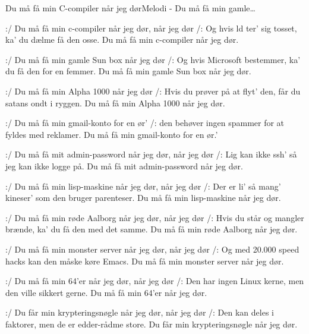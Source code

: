 \begin{sang}{Du må få min C-compiler når jeg dør}{Melodi - Du må få min gamle…}

\begin{vers}
:/ Du må få min c-compiler når jeg dør, når jeg dør /:
Og hvis ld ter' sig tosset, ka' du dælme få den osse.
Du må få min c-compiler når jeg dør.
\end{vers}
\begin{vers}
:/ Du må få min gamle Sun box når jeg dør /:
Og hvis Microsoft bestemmer, ka' du få den for en femmer.
Du må få min gamle Sun box når jeg dør.
\end{vers}
\begin{vers}
:/ Du må få min Alpha 1000 når jeg dør /:
Hvis du prøver på at flyt' den, får du satans ondt i ryggen.
Du må få min Alpha 1000 når jeg dør.
\end{vers}
\begin{vers}
:/ Du må få min gmail-konto for en ør' /:
den behøver ingen spammer for at fyldes med reklamer.
Du må få min gmail-konto for en ør.'
\end{vers}
\begin{vers}
:/ Du må få mit admin-password når jeg dør, når jeg dør /:
Lig kan ikke ssh' så jeg kan ikke logge på.
Du må få mit admin-password når jeg dør.
\end{vers}
\begin{vers}
:/ Du må få min lisp-maskine når jeg dør, når jeg dør /:
Der er li' så mang' kineser' som den bruger parenteser.
Du må få min lisp-maskine når jeg dør.
\end{vers}
\begin{vers}
:/ Du må få min røde Aalborg når jeg dør, når jeg dør /:
Hvis du står og mangler brænde, ka' du få den med det samme.
Du må få min røde Aalborg når jeg dør.
\end{vers}
\begin{vers}
:/ Du må få min monster server når jeg dør, når jeg dør /:
Og med 20.000 speed hacks kan den måske køre Emacs.
Du må få min monster server når jeg dør.
\end{vers}
\begin{vers}
:/ Du må få min 64'er når jeg dør, når jeg dør /:
Den har ingen Linux kerne, men den ville sikkert gerne.
Du må få min 64'er når jeg dør.
\end{vers}
\begin{vers}
:/ Du får min krypteringsnøgle når jeg dør, når jeg dør /:
Den kan deles i faktorer, men de er edder-rådme store.
Du får min krypteringsnøgle når jeg dør.

\end{vers}
\end{sang}
